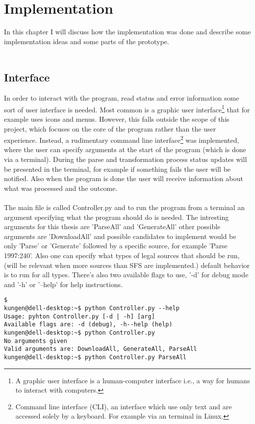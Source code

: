 \chapter{Implementation}

In this chapter I will discuss how the implementation was done and describe some implementation ideas and some parts of the prototype.\\\\

\section{Interface}
In order to interact with the program, read status and error information some sort of user interface is needed. Most common is a graphic user interface\footnote{A graphic user interface is a human-computer interface i.e., a way for humans to interact with computers.} that for example uses icons and menus. However, this falls outside the scope of this project, which focuses on the core of the program rather than the user experience. Instead, a rudimentary command line interface\footnote{Command line interface (CLI), an interface which use only text and are accessed solely by a keyboard. For example via an terminal in Linux.} was implemented, where the user can specify arguments at the start of the program (which is done via a terminal). During the parse and transformation process status updates will be presented in the terminal, for example if something fails the user will be notified. Also when the program is done the user will receive information about what was processed and the outcome.\\\\
The main file is called Controller.py and to run the program from a terminal an argument specifying what the program should do is needed. The intresting arguments for this thesis are 'ParseAll' and 'GenerateAll' other possible arguments are 'DownloadAll' and possible candidates to implement would be only 'Parse' or 'Generate' followed by a specific source, for example 'Parse 1997:240'. Also one can specify what types of legal sources that should be run, (will be relevant when more sources than SFS are implemented.) default behavior is to run for all types. There's also two available flags to use, '-d' for debug mode and '-h' or '--help' for help instructions.    

\begin{verbatim}
$
kungen@dell-desktop:~$ python Controller.py --help
Usage: pyhton Controller.py [-d | -h] [arg]
Available flags are: -d (debug), -h--help (help)
kungen@dell-desktop:~$ python Controller.py
No arguments given
Valid arguments are: DownloadAll, GenerateAll, ParseAll
kungen@dell-desktop:~$ python Controller.py ParseAll

\end{verbatim}

